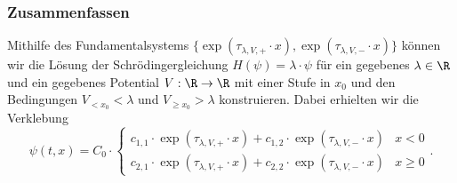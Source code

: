 \documentclass{subfiles}
\begin{document}
        
    
    \subsubsection*{Zusammenfassen}
        Mithilfe des Fundamentalsystems $\{\exp(\tau_{\lambda,V,+}\cdot x),\exp(\tau_{\lambda,V,-}\cdot x)\}$ können wir die Lösung der Schrödingergleichung $H(\psi) = \lambda\cdot\psi$ für ein gegebenes $\lambda\in\R$ und ein gegebenes Potential $V:\R\to\R$ mit einer Stufe in $x_0$ und den Bedingungen $V_{<x_0}<\lambda$ und $V_{\geq x_0}>\lambda$ konstruieren. Dabei erhielten wir die Verklebung
        \[
            \psi(t,x) = C_0\cdot\begin{cases}
                c_{1,1}\cdot\exp(\tau_{\lambda,V,+}\cdot x) + c_{1,2}\cdot\exp(\tau_{\lambda,V,-}\cdot x) & x < 0 \\
                c_{2,1}\cdot\exp(\tau_{\lambda,V,+}\cdot x) + c_{2,2}\cdot\exp(\tau_{\lambda,V,-}\cdot x) & x\geq 0
            \end{cases}.
        \]
\end{document}
